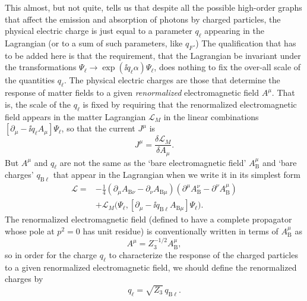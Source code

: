 This almost, but not quite, tells us that despite all the possible high-order
graphs that affect the emission and absorption of photons by charged particles,
the physical electric charge is just equal to a parameter $q_\ell$ appearing in
the Lagrangian (or to a sum of such parameters, like $q_F$.) The qualification
that has to be added here is that the requirement, that the Lagrangian be
invariant under the transformations
$\Psi_\ell\to\exp(\ii q_\ell\alpha)\Psi_\ell$, does nothing to fix the over-all
scale of the quantities $q_\ell$. The physical electric charges are those that
determine the response of matter fields to a given \emph{renormalized}
electromagnetic field $A^\mu$. That is, the scale of the $q_\ell$ is fixed by
requiring that the renormalized electromagnetic field appears in the matter
Lagrangian $\mathcal L_M$ in the linear combinations
$[\partial_\mu-\ii q_\ell A_\mu]\Psi_\ell$, so that the current $J^\mu$ is
\begin{equation}
J^\mu=\frac{\delta\mathcal L_M}{\delta A_\mu}.
\tag{10.4.15}\label{eq:10.4.15}
\end{equation}
But $A^\mu$ and $q_\ell$ are not the same as the `bare electromagnetic field'
$A_{\mathrm B}^\mu$ and `bare charges' $q_{\mathrm B\ell}$ that appear in the
Lagrangian when we write it in its simplest form
\begin{equation}
\begin{split}
\mathcal L={}&-\frac14(\partial_\mu A_{{\mathrm B}\nu}
-\partial_\nu A_{{\mathrm B}\mu})
(\partial^\mu A_{\mathrm B}^{\nu}-\partial^\nu A_{\mathrm B}^{\mu})
\\
&+\mathcal L_M\bigl(\Psi_\ell,
[\partial_\mu-\ii q_{\mathrm B\ell}A_{{\mathrm B}\mu}]\Psi_\ell\bigr).
\end{split}
\tag{10.4.16}\label{eq:10.4.16}
\end{equation}
The renormalized electromagnetic field (defined to have a complete propagator
whose pole at $p^2=0$ has unit residue) is conventionally written in terms of
$A_{\mathrm B}^\mu$ as
\begin{equation}
A^\mu=Z_3^{-1/2}A_{\mathrm B}^\mu,
\tag{10.4.17}\label{eq:10.4.17}
\end{equation}
so in order for the charge $q_\ell$ to characterize the response of the
charged particles to a given renormalized electromagnetic field, we should
define the renormalized charges by
\begin{equation}
q_\ell=\sqrt{Z_3}\,q_{\mathrm B\ell}.
\tag{10.4.18}\label{eq:10.4.18}
\end{equation}

